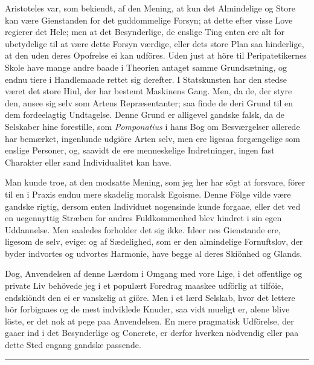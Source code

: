 \documentclass[12pt,a4paper]{article}
\newcommand{\opage}[1]{\marginnote{\footnotesize\textit{[#1]}}}
\begin{document}
\opage{253} Aristoteles var, som bekiendt, af den Mening, at kun det Almindelige
og Store kan være Gienstanden for det guddommelige Forsyn; at dette efter
visse Love regierer det Hele; men at det Besynderlige, de enslige Ting enten
ere alt for ubetydelige til at være dette Forsyn værdige, eller dets store
Plan saa hinderlige, at den uden deres Opofrelse ei kan udföres. Uden just
at höre til Peripatetikernes Skole have mange andre baade i Theorien antaget
samme Grundsætning, og endnu tiere i Handlemaade rettet sig derefter. I
Statskunsten har den stedse været det store Hiul, der har bestemt Maskinens
Gang. Men, da de, der styre den, ansee sig selv som Artens Repræsentanter;
saa finde de deri Grund til en dem fordeelagtig Undtagelse. Denne Grund er
alligevel gandske falsk, da de Selskaber hine forestille, som
\emph{Pomponatius} i hans Bog om Besværgelser allerede har bemærket,
ingenlunde udgiöre Arten selv, men ere ligesaa forgængelige som enslige
Personer, og, saavidt de ere menneskelige Indretninger, ingen fast Charakter
eller sand Individualitet kan have.

Man kunde troe, at den modsatte Mening, som jeg her har sögt at forsvare,
förer til en i Praxis endnu mere skadelig moralsk Egoisme. Denne Fölge vilde
være gandske rigtig, dersom enten Individuet nogensinde kunde forgaae, eller
det ved en uegennyttig Stræben for andres Fuldkommenhed blev hindret i sin
egen Uddannelse. Men saaledes forholder det sig ikke. Ideer%
\opage{254}nes Gienstande ere, ligesom de selv, evige: og af Sædelighed, som er den
almindelige Fornuftslov, der byder indvortes og udvortes Harmonie, have
begge al deres Skiönhed og Glands.

Dog, Anvendelsen af denne Lærdom i Omgang med vore Lige, i det offentlige og
private Liv behövede jeg i et populært Foredrag maaskee udförlig at tilföie,
endskiöndt den ei er vanskelig at giöre. Men i et lærd Selskab, hvor det
lettere bör forbigaaes og de mest indviklede Knuder, saa vidt mueligt er,
alene blive löste, er det nok at pege paa Anvendelsen. En mere pragmatisk
Udförelse, der gaaer ind i det Besynderlige og Concrete, er derfor hverken
nödvendig eller paa dette Sted engang gandske passende.

\begin{center}\rule{0.25\linewidth}{0.4pt}\end{center}
\end{document}
